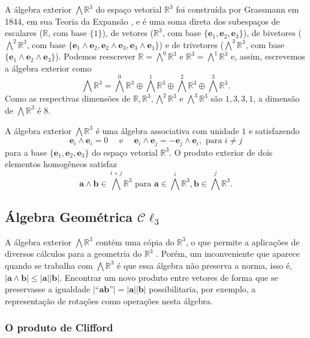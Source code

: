 \documentclass[a4paper,12pt]{report}
\theoremstyle{plain}
\theoremstyle{definition}
\newcommand{\norm}[1]{\left| #1 \right|}
\begin{document}
	A álgebra exterior $\bigwedge\mathbb{R}^3$ do espaço vetorial $\mathbb{R}^3$ foi construída por Grassmann em 1844, em sua Teoria da Expansão \cite{grassmannLineale}, e é uma soma direta dos subespaços de escalares ($\mathbb{R}$, com base $\{1\}$), de vetores ($\mathbb{R}^3$, com base $\{\mathbf e_1,\mathbf e_2,\mathbf e_3\}$), de bivetores ($\bigwedge^2\mathbb{R}^3$, com base $\{\mathbf e_1\wedge\mathbf e_2, \mathbf e_2\wedge\mathbf e_3, \mathbf e_3\wedge\mathbf e_1\}$) e de trivetores ($\bigwedge^3\mathbb{R}^3$, com base $\{\mathbf e_1\wedge\mathbf e_2\wedge\mathbf e_3\}$). Podemos reescrever $\mathbb{R} = \bigwedge^0\mathbb{R}^3$ e $\mathbb{R}^3 = \bigwedge^1\mathbb{R}^3$ e, assim, escrevemos a álgebra exterior como $$\bigwedge\mathbb{R}^3 = \bigwedge^0\mathbb{R}^3 \oplus \bigwedge^1\mathbb{R}^3\oplus \bigwedge^2\mathbb{R}^3 \oplus \bigwedge^3\mathbb{R}^3.$$
	Como as respectivas dimensões de $\mathbb{R}, \mathbb{R}^3, \bigwedge^2\mathbb{R}^3$ e $\bigwedge^3\mathbb{R}^3$ são $1,3,3,1$, a dimensão de $\bigwedge\mathbb{R}^3$ é 8.
	 
	A álgebra exterior $\bigwedge\mathbb{R}^3$ é uma álgebra associativa com unidade $1$ e satisfazendo $$\mathbf e_i\wedge\mathbf e_i = 0\quad \text{ e } \quad\mathbf e_i\wedge\mathbf e_j = -\mathbf e_j \wedge\mathbf e_i, \text{ para } i\neq j$$ para a base $\{\mathbf e_1,\mathbf e_2,\mathbf e_3\}$ do espaço vetorial $\mathbb{R}^3$. O produto exterior de dois elementos homogêneos satisfaz
	$$\mathbf a\wedge\mathbf b\in \bigwedge^{i+j}\mathbb{R}^3\text{ para } \mathbf a\in \bigwedge^i\mathbb{R}^3, \mathbf b\in \bigwedge^j\mathbb{R}^3.$$	
	
	\subsection{Álgebra Geométrica $\mathcal C \ell_3$}
	A álgebra exterior $\bigwedge\mathbb{R}^3$ contém uma cópia do $\mathbb{R}^3$, o que permite a aplicações de diversos cálculos para a geometria do $\mathbb{R}^3$ \cite{lounestoClifford}. Porém, um inconveniente que aparece quando se trabalha com $\bigwedge\mathbb{R}^3$ é que essa álgebra não preserva a norma, isso é, $\norm{\mathbf a\wedge\mathbf b}\leq \norm{\mathbf a}\norm{\mathbf b}$. Encontrar um novo produto entre vetores de forma que se preservasse a igualdade $\norm{\text{``}\mathbf a\mathbf b\text{''}} = \norm{\mathbf a}\norm{\mathbf b}$ possibilitaria, por exemplo, a representação de rotações como operações nesta álgebra. 
	
	\subsubsection{O produto de Clifford}
	
\end{document}
